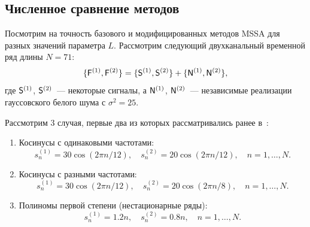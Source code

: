 \documentclass[specialist,
substylefile = spbu_report.rtx,
subf,href,colorlinks=true, 12pt]{disser}
\theoremstyle{definition}
\begin{document}

\subsection{Численное сравнение методов}
Посмотрим на точность базового и модифицированных методов MSSA для разных значений параметра $L$. Рассмотрим следующий двухканальный временной ряд длины ${N=71}$:
$$\{\mathsf{F}^{(1)}, \mathsf{F}^{(2)}\}=\{\mathsf{S}^{(1)},\mathsf{S}^{(2)}\} + \{\mathsf{N}^{(1)},\mathsf{N}^{(2)}\},$$
где $\mathsf{S}^{(1)}$, $\mathsf{S}^{(2)}$~--- некоторые сигналы, а $\mathsf{N}^{(1)}$, $\mathsf{N}^{(2)}$~--- независимые реализации гауссовского белого шума с $\sigma^2=25$.

Рассмотрим 3 случая, первые два из которых рассматривались ранее в~\cite{Golyandina_2015}:
\begin{enumerate}
	\item Косинусы с одинаковыми частотами:
	      \[
		      s_n^{(1)}=30\cos(2\pi n/12),\quad s_n^{(2)}=20\cos(2\pi n/12),\quad n=1,\ldots, N.
	      \]
	\item Косинусы с разными частотами:
	      \[
		      s_n^{(1)}=30\cos(2\pi n/12),\quad s_n^{(2)}=20\cos(2\pi n/8),\quad n=1,\ldots, N.
	      \]
	\item Полиномы первой степени (нестационарные ряды):
	      \[
		      s_n^{(1)}=1.2n,\quad s_n^{(2)}=0.8n,\quad n=1,\ldots,N.
	      \]
\end{enumerate}
\end{document}

